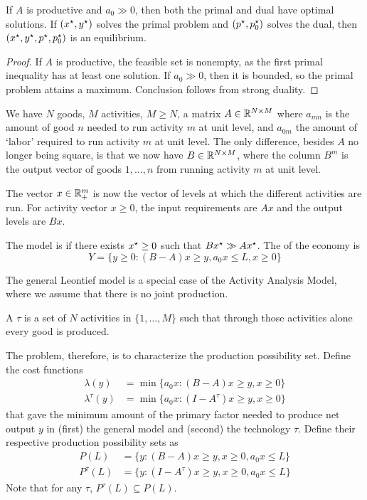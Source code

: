 \documentclass[10pt]{article}
\begin{document}
\begin{theorem}
	If $A$ is productive and $a_0 \gg 0$, then both the primal and dual have optimal solutions. If $(x^\star,y^\star)$ solves the primal problem and $(p^\star,p_0^\star)$ solves the dual, then $(x^\star,y^\star,p^\star,p_0^\star)$ is an equilibrium.
\end{theorem}
\begin{proof}
	If $A$ is productive, the feasible set is nonempty, as the first primal inequality has at least one solution. If $a_0 \gg 0$, then it is bounded, so the primal problem attains a maximum. Conclusion follows from strong duality.
\end{proof}


\begin{model}
	 We have $N$ goods, $M$ activities, $M \ge N$, a matrix $A \in \mathbb{R}^{N \times M}$ where $a_{mn}$ is the amount of good $n$ needed to run activity $m$ at unit level, and $a_{0m}$ the amount of `labor' required to run activity $m$ at unit level. The only difference, besides $A$ no longer being square, is that we now have $B \in \mathbb{R}^{N \times M}$, where the column $B^m$ is the output vector of goods $1,\dots,n$ from running activity $m$ at unit level.
	
	The vector $x \in \mathbb{R}^m_+$ is now the vector of levels at which the different activities are run. For activity vector $x \ge 0$, the input requirements are $Ax$ and the output levels are $Bx$. 
	
	\begin{definition}
		The model is  if there exists $x^\star \ge 0$ such that $Bx^\star \gg Ax^\star$. The  of the economy is \[Y = \{y \ge 0 : (B-A)x \ge y, a_0x \le L, x \ge 0\}\]
	\end{definition}
	\begin{remark}
		The general Leontief model is a special case of the Activity Analysis Model, where we assume that there is no joint production.
	\end{remark}
	\begin{definition}
		A  $\tau$ is a set of $N$ activities in $\{1,\dots,M\}$ such that through those activities alone every good is produced.
	\end{definition}
	The problem, therefore, is to characterize the production possibility set. Define the cost functions \begin{align*} \lambda(y) &= \min\{a_0 x: (B-A)x \ge y , x \ge 0\} \\ \lambda^\tau (y) &= \min\{a_0 x : (I-A^\tau)x \ge y, x \ge 0\}\end{align*}that gave the minimum amount of the primary factor needed to produce net output $y$ in (first) the general model and (second) the technology $\tau$. Define their respective production possibility sets as \begin{align*} P(L) &= \{y : (B-A)x \ge y , x \ge 0, a_0 x \le L\} \\ P^\tau(L) &= \{y : (I-A^\tau)x \ge y, x \ge 0, a_0x \le L\}\end{align*}Note that for any $\tau$, $P^\tau(L) \subseteq P(L)$. 
\end{model}
\end{document}
